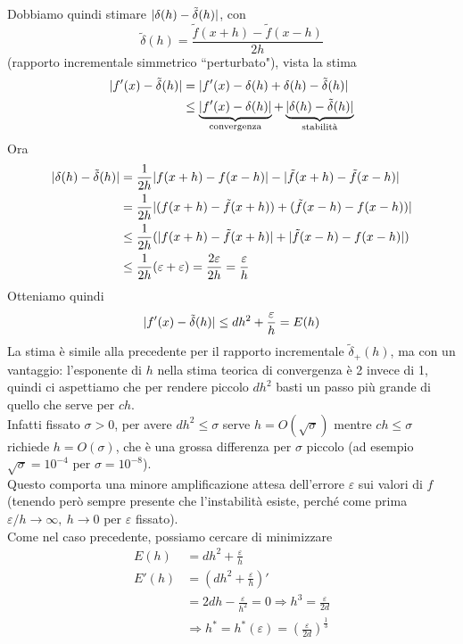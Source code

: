 \documentclass[12pt,a4paper]{article}
\DeclarePairedDelimiter{\abs}{\lvert}{\rvert}
\begin{document}
Dobbiamo quindi stimare $\abs{\delta(h) - \tilde{\delta}(h)}$, con
\[
\tilde{\delta}(h) = \frac{\tilde{f}(x+h) - \tilde{f}(x-h)}{2h}
\]
(rapporto incrementale simmetrico ``perturbato"), vista la stima
\[
\begin{split}
    \abs{f'(x) - \tilde{\delta}(h)} & = \abs{f'(x) - \delta(h) + \delta(h) - \tilde{\delta}(h)} \\
    & \le \underbrace{\abs{f'(x) - \delta(h)}}_{\text{convergenza}} + \underbrace{\abs{\delta(h) - \tilde{\delta}(h)}}_{\text{stabilità}}
\end{split}
\]
Ora
\[
\begin{split}
    \abs{\delta(h) - \tilde{\delta}(h)} & = \frac{1}{2h} \abs{f(x+h) - f(x-h)} - \abs{\tilde{f}(x+h) - \tilde{f}(x-h)} \\
    & = \frac{1}{2h} \abs{(f(x+h) - \tilde{f}(x+h)) + (\tilde{f}(x-h) - f(x-h))} \\
    & \le \frac{1}{2h} (\abs{f(x+h) - \tilde{f}(x+h)} + \abs{\tilde{f}(x-h) - f(x-h)}) \\
    & \le \frac{1}{2h} (\varepsilon + \varepsilon) = \frac{2 \varepsilon}{2h} = \frac{\varepsilon}{h}
\end{split}
\]
Otteniamo quindi
\[
\abs{f'(x) - \tilde{\delta}(h)} \le dh^2 + \frac{\varepsilon}{h} = E(h)
\]
La stima è simile alla precedente per il rapporto incrementale $\tilde{\delta}_+ (h)$, ma con un vantaggio: l'esponente di $h$ nella stima teorica di convergenza è 2
invece di 1, quindi ci aspettiamo che per rendere piccolo $dh^2$ basti un passo più grande di quello che serve per $ch$.\\
Infatti fissato $\sigma > 0$, per avere $dh^2 \le \sigma$ serve $h = O(\sqrt{\sigma})$ mentre $ch \le \sigma$ richiede $h = O(\sigma)$, che è una grossa differenza per $\sigma$ piccolo (ad esempio $\sqrt{\sigma} = 10^{-4}$ per $\sigma = 10^{-8}$).\\
Questo comporta una minore amplificazione attesa dell'errore $\varepsilon$ sui valori di $f$ (tenendo
però sempre presente che l'instabilità esiste, perché come prima $\varepsilon/h \to \infty, \ h \to 0$ per $\varepsilon$ fissato).\\
Come nel caso precedente, possiamo cercare di minimizzare
\[
\begin{split}
E(h) & = dh^2 + \frac{\varepsilon}{h} \\
E'(h) & = \left(dh^2 + \frac{\varepsilon}{h}\right)' \\
& = 2dh - \frac{\varepsilon}{h^2} = 0 \Rightarrow h^3 = \frac{\varepsilon}{2d} \\
& \Rightarrow h^* = h^* (\varepsilon) = \left(\frac{\varepsilon}{2d}\right)^{\frac{1}{3}}
\end{split}
\]
\end{document}
